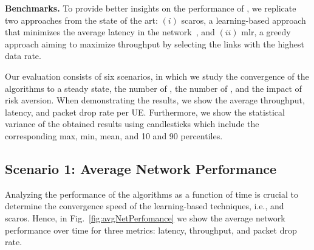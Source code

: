 \begin{table}[t!]
\caption{Simulation parameters.}
\centering
{}\end{table}

\textbf{Benchmarks.} To provide better insights on the performance of \name{}, we replicate two approaches from the state of the art: $(i)$ \gls{scaros}, a learning-based approach that minimizes the average latency in the network~\cite{ortiz2019scaros}, and $(ii)$ \gls{mlr}, a greedy approach aiming to maximize throughput by selecting the links with the highest data rate.


Our evaluation consists of six scenarios, in which we study the convergence of the algorithms to a steady state, the number of \nodes{}, the number of \donors{}, and the impact of risk aversion. When demonstrating the results, we show the average throughput, latency, and packet drop rate per UE. Furthermore, we show the statistical variance of the obtained results using candlesticks which include the corresponding max, min, mean, and 10 and 90 percentiles. 



\subsection{Scenario 1: Average Network Performance}
\label{sub:netPerformance}
Analyzing the performance of the algorithms as a function of time is crucial to determine the convergence speed of the learning-based techniques, i.e.,  \name{} and \gls{scaros}. Hence, in Fig.~\ref{fig:avgNetPerfomance} we show the average network performance over time for three metrics: latency, throughput, and packet drop rate.


